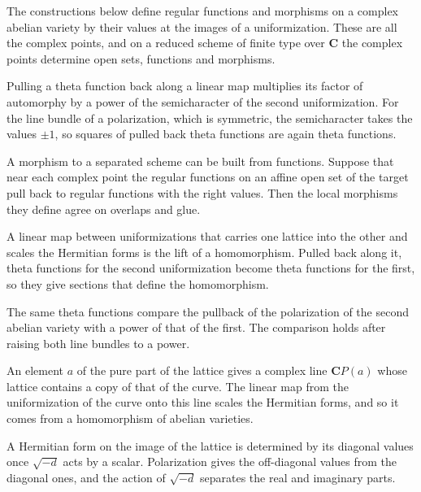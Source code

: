 The constructions below define regular functions and morphisms on a complex abelian variety by their values at the
images of a uniformization. These are all the complex points, and on a reduced scheme of finite type over $\mathbf C$ the
complex points determine open sets, functions and morphisms.

Pulling a theta function back along a linear map multiplies its factor of automorphy by a power of the semicharacter of
the second uniformization. For the line bundle of a polarization, which is symmetric, the semicharacter takes the values
$\pm1$, so squares of pulled back theta functions are again theta functions.

A morphism to a separated scheme can be built from functions. Suppose that near each complex point the regular functions on
an affine open set of the target pull back to regular functions with the right values. Then the local morphisms they
define agree on overlaps and glue.

A linear map between uniformizations that carries one lattice into the other and scales the Hermitian forms is the lift
of a homomorphism. Pulled back along it, theta functions for the second uniformization become theta functions for the
first, so they give sections that define the homomorphism.

The same theta functions compare the pullback of the polarization of the second abelian variety with a power of that
of the first. The comparison holds after raising both line bundles to a power.

An element $a$ of the pure part of the lattice gives a complex line $\mathbf CP(a)$ whose lattice contains a copy of that
of the curve. The linear map from the uniformization of the curve onto this line scales the Hermitian forms, and so it
comes from a homomorphism of abelian varieties.

A Hermitian form on the image of the lattice is determined by its diagonal values once $\sqrt{-d}$ acts by a scalar.
Polarization gives the off-diagonal values from the diagonal ones, and the action of $\sqrt{-d}$ separates the real and
imaginary parts.

